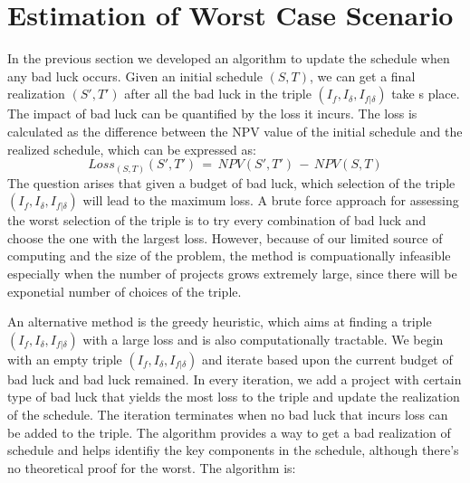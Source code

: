 \documentclass[final,3p,times]{elsarticle}
\begin{document}
\section{Estimation of Worst Case Scenario}
In the previous section we developed an algorithm to update the schedule when any bad luck occurs. Given an initial schedule $(S, T)$, we can get a final realization $(S', T')$ after all the bad luck in the triple $(I_f, I_{\delta}, I_{f|\delta})$  take s place.  The impact of bad luck can be quantified by the loss it incurs. The loss is calculated as the difference between the NPV value of the initial schedule and the realized schedule, which can be expressed as:
\begin{equation}
	Loss_{(S,T)}(S',T')\,=\, NPV(S',T')\,-\,NPV(S,T)
\end{equation}
The question arises that given a budget of bad luck, which selection of the triple $(I_f, I_{\delta}, I_{f|\delta})$  will lead to the maximum loss. A brute force approach for assessing the worst selection of the triple is to try every combination of bad luck and choose the one with the largest loss. However, because of our limited source of computing and the size of the problem, the method is compuationally infeasible especially when the number of projects grows extremely large, since there will be exponetial number of choices of the triple. 

An alternative method is the greedy heuristic, which  aims at finding a triple $(I_f, I_{\delta}, I_{f|\delta})$ with a large loss and is also computationally tractable. We begin with an empty triple  $(I_f, I_{\delta}, I_{f|\delta})$ and iterate based upon the current budget of bad luck and bad luck remained. In every iteration, we add a project with certain type of bad luck that yields the most loss to the triple and update the realization of the schedule. The iteration terminates when no bad luck that incurs loss can be added to the triple. The algorithm provides a way to get a bad realization of schedule and helps identifiy the key components in the schedule, although there's no theoretical proof for the worst. The algorithm is:
\linebreak
\begin{algorithm}[H]\label{EstimateWorst}
\end{algorithm} 
\end{document}

